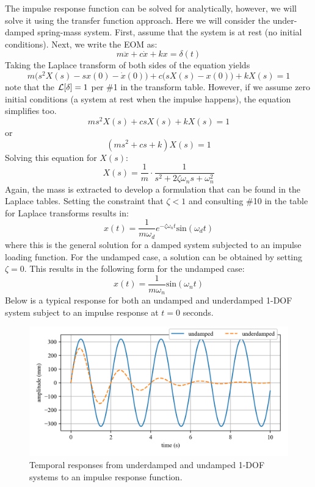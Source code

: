 \documentclass[12pt,letter]{article}
\begin{document}
The impulse response function can be solved for analytically, however, we will solve it using the transfer function approach. Here we will consider the under-damped spring-mass system. First, assume that the system is at rest (no initial conditions). Next, we write the EOM as:
\begin{equation}
m\ddot{x} +c\dot{x} +kx = \delta(t)
\end{equation}
Taking the Laplace transform of both sides of the equation yields 
\begin{equation}
m\big(s^2X(s)-sx(0) - \dot{x}(0)\big) + c\big(sX(s)-x(0)\big) +kX(s) =1
\end{equation}
note that the $\mathcal{L}{\left[\delta\right]}=1$ per \#1 in the transform table. However, if we assume zero initial conditions (a system at rest when the impulse happens), the equation simplifies too. 
\begin{equation}
ms^2X(s) + csX(s) +kX(s) =1
\end{equation}
or
\begin{equation}
(ms^2 + cs +k)X(s) =1
\end{equation}
Solving this equation for $X(s)$:
\begin{equation}
X(s) = \frac{1}{m} \cdot \frac{1}{s^2 + 2 \zeta \omega_n s + \omega_n^2}
\end{equation}
Again, the mass is extracted to develop a formulation that can be found in the Laplace tables. Setting the constraint that $\zeta<1$ and consulting \#10 in the table for Laplace transforms results in:
\begin{equation}
x(t) = \frac{1}{m \omega_d} e^{-\zeta \omega_n t} \text{sin}(\omega_dt)
\label{eq:impulse_load_damped}
\end{equation}
where this is the general solution for a damped system subjected to an impulse loading function. For the undamped case, a solution can be obtained by setting $\zeta=0$. This results in the following form for the undamped case:
\begin{equation}
x(t) = \frac{1}{m \omega_n}\text{sin}(\omega_n t)
\end{equation}
Below is a typical response for both an undamped and underdamped 1-DOF system subject to an impulse response at $t=0$ seconds. 
\begin{figure}[H]
	\centering
	\includegraphics[]{../figures/response_impulse.png}
	\caption{Temporal responses from underdamped and undamped 1-DOF systems to an impulse response function.}
\end{figure}
\end{document}
